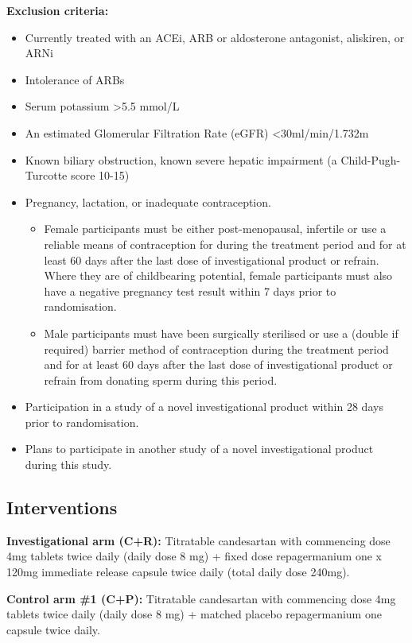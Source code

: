 \documentclass[11pt,parskip=half-]{scrartcl}
\begin{document}
\textbf{Exclusion criteria:}
\begin{itemize}
    \item Currently treated with an ACEi, ARB or aldosterone antagonist, aliskiren, or ARNi
    \item Intolerance of ARBs
    \item Serum potassium >5.5 mmol/L
    \item An estimated Glomerular Filtration Rate (eGFR) <30ml/min/1.732m
    \item Known biliary obstruction, known severe hepatic impairment (a Child-Pugh-Turcotte score 10-15)
    \item Pregnancy, lactation, or inadequate contraception.
          \begin{itemize}
              \item Female participants must be either post-menopausal, infertile or use a reliable means of contraception for during the treatment period and for at least 60 days after the last dose of investigational product or refrain. Where they are of childbearing potential, female participants must also have a negative pregnancy test result within 7 days prior to randomisation.
              \item Male participants must have been surgically sterilised or use a (double if required) barrier method of contraception during the treatment period and for at least 60 days after the last dose of investigational product or refrain from donating sperm during this period.
          \end{itemize}
    \item Participation in a study of a novel investigational product within 28 days prior to randomisation.
    \item Plans to participate in another study of a novel investigational product during this study.
\end{itemize}

\subsection{Interventions}
\textbf{Investigational arm (C+R):} Titratable candesartan with commencing dose 4mg tablets twice daily (daily dose 8 mg) + fixed dose repagermanium one x 120mg immediate release capsule twice daily (total daily dose 240mg).

\textbf{Control arm \#1 (C+P):} Titratable candesartan with commencing dose 4mg tablets twice daily (daily dose 8 mg) + matched placebo repagermanium one capsule twice daily.
\end{document}
